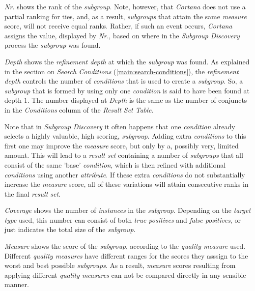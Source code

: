 \documentclass{article}
\begin{document}
\emph{Nr.} shows the rank of the \emph{subgroup}.
Note, however, that \emph{Cortana} does not use a partial ranking for ties, and, as a result, \emph{subgroups} that attain the same \emph{measure} score, will not receive equal ranks.
Rather, if such an event occurs, \emph{Cortana} assigns the value, displayed by \emph{Nr.}, based on where in the \emph{Subgroup Discovery} process the \emph{subgroup} was found.

\emph{Depth} shows the \emph{refinement depth} at which the \emph{subgroup} was found.
As explained in the section on \emph{Search Conditions} (\ref{main:search-conditions}), the \emph{refinement depth} controls the number of \emph{conditions} that is used to create a \emph{subgroup}.
So, a \emph{subgroup} that is formed by using only one \emph{condition} is said to have been found at depth $1$.
The number displayed at \emph{Depth} is the same as the number of conjuncts in the \emph{Conditions} column of the \emph{Result Set Table}.

Note that in \emph{Subgroup Discovery} it often happens that one \emph{condition} already selects a highly valuable, high scoring, \emph{subgroup}.
Adding extra \emph{conditions} to this first one may improve the \emph{measure} score, but only by a, possibly very, limited amount.
This will lead to a \emph{result set} containing a number of \emph{subgroups} that all consist of the same 'base' \emph{condition}, which is then refined with additional \emph{conditions} using another \emph{attribute}.
If these extra \emph{conditions} do not substantially increase the \emph{measure} score, all of these variations will attain consecutive ranks in the final \emph{result set}.

\emph{Coverage} shows the number of \emph{instances} in the \emph{subgroup}.
Depending on the \emph{target type} used, this number can consist of both \emph{true positives} and \emph{false positives}, or just indicates the total size of the \emph{subgroup}.

\emph{Measure} shows the score of the \emph{subgroup}, according to the \emph{quality measure} used.
Different \emph{quality measures} have different ranges for the scores they asssign to the worst and best possible \emph{subgroups}.
As a result, \emph{measure} scores resulting from applying different \emph{quality measures} can not be compared directly in any sensible manner.
\end{document}
